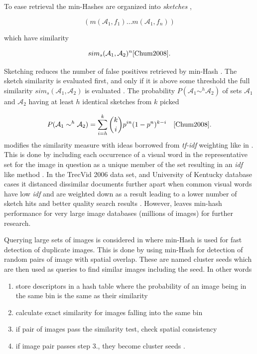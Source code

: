 \documentclass[english,12pt,a4paper,pdftex,elec,utf8]{aaltothesis}
\begin{document}
To ease retrieval the min-Hashes are organized into \emph{sketches} \cite{Chum2008}, \cite{Broder1997}

\begin{equation}\label{sketch}
(m(\mathcal{A_1},f_1) \ldots m(\mathcal{A_1},f_n))
\end{equation}

which have similarity

\begin{equation}\label{sketchsim}
sim_s(\mathcal{A}_1, \mathcal{A}_2)^n \cite{Chum2008}.
\end{equation}

Sketching reduces the number of false positives retrieved by min-Hash \cite{Chum2008}. The sketch similarity is evaluated first, and only if it is above some threshold the full similarity $sim_s(\mathcal{A}_1, \mathcal{A}_2)$ is evaluated \cite{Chum2008}. The probability $P(\mathcal{A}_1 \sim^h \mathcal{A}_2)$ of sets $\mathcal{A}_1$ and $\mathcal{A}_2$ having at least $h$ identical sketches from $k$ picked

\begin{equation} \label{sketchsimilarityprob}
P(\mathcal{A}_1 \sim^h \mathcal{A}_2) = \sum_{i=h}^k \binom{k}{i} p^{in}(1-p^n)^{k-i} \quad \cite{Chum2008}.
\end{equation}
\cite{Chum2008} modifies the similarity measure with ideas borrowed from \emph{tf-idf} weighting like in \cite{Sivic2003}. This is done by including each occurrence of a visual word in the representative set for the image in question as a unique member of the set resulting in an \emph{idf} like method \cite{Chum2010}. In the TrecVid 2006 data set, and University of Kentucky database cases it distanced dissimilar documents further apart when common visual words have low \emph{idf} and are weighted down as a result leading to a lower number of sketch hits and better quality search results \cite{Chum2008}. However, \cite{Chum2008} leaves min-hash performance for very large image databases (millions of images) for further research.

Querying large sets of images is considered in \cite{Chum2010} where min-Hash is used for fast detection of duplicate images. This is done by using min-Hash for detection of random pairs of image with spatial overlap. These are named cluster seeds which are then used as queries to find similar images including the seed. In other words

\begin{enumerate}
\item store descriptors in a hash table where the probability of an image being in the same bin is the same as their similarity
\item calculate exact similarity for images falling into the same bin
\item if pair of images pass the similarity test, check spatial consistency
\item if image pair passes step 3., they become cluster seeds \cite{Chum2010}.
\end{enumerate}
\end{document}
